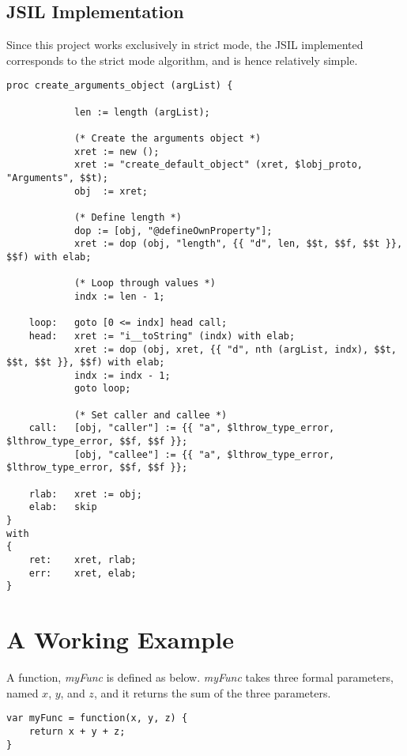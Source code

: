 \documentclass[a4paper,11pt,twoside]{report}
\begin{document}
\subsection{JSIL Implementation}
Since this project works exclusively in strict mode, the JSIL implemented corresponds to the strict mode algorithm, and is hence relatively simple.
\begin{adjustwidth}{2cm}{2cm}
\begin{lstlisting}
proc create_arguments_object (argList) { 

			len := length (argList);
			
			(* Create the arguments object *)
			xret := new ();
			xret := "create_default_object" (xret, $lobj_proto, "Arguments", $$t);
			obj  := xret;

			(* Define length *)
			dop := [obj, "@defineOwnProperty"];
			xret := dop (obj, "length", {{ "d", len, $$t, $$f, $$t }}, $$f) with elab;		
			
			(* Loop through values *)
			indx := len - 1;
			
	loop:	goto [0 <= indx] head call;
	head:	xret := "i__toString" (indx) with elab;
			xret := dop (obj, xret, {{ "d", nth (argList, indx), $$t, $$t, $$t }}, $$f) with elab;
			indx := indx - 1;
			goto loop;
			
			(* Set caller and callee *)
	call:	[obj, "caller"] := {{ "a", $lthrow_type_error, $lthrow_type_error, $$f, $$f }};
			[obj, "callee"] := {{ "a", $lthrow_type_error, $lthrow_type_error, $$f, $$f }};

	rlab:	xret := obj;
	elab:	skip
}
with
{
	ret:	xret, rlab;
	err:	xret, elab;
}
\end{lstlisting}
\end{adjustwidth}

\section{A Working Example}
A function, \textit{myFunc} is defined as below. \textit{myFunc} takes three formal parameters, named $x$, $y$, and $z$, and it returns the sum of the three parameters.
\begin{adjustwidth}{2cm}{2cm}
\begin{lstlisting}
var myFunc = function(x, y, z) {
	return x + y + z;
}
\end{lstlisting}
\end{adjustwidth}
\end{document}

